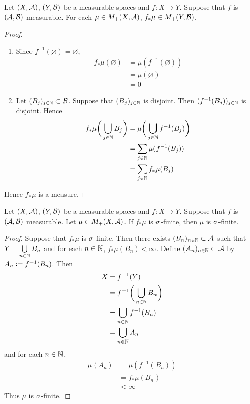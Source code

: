 \documentclass{book}
\begin{document}
\begin{ex} 
	Let $(X, \mathcal{A})$, $(Y, \mathcal{B})$ be a measurable spaces and $f: X \rightarrow Y$. Suppose that $f$ is $(\mathcal{A}, \mathcal{B})$ measurable. For each $\mu \in M_+(X, \mathcal{A})$, $f_*\mu \in M_+(Y, \mathcal{B})$.
\end{ex}

\begin{proof}\
	\begin{enumerate}
		\item Since $f^{-1}(\varnothing) = \varnothing$, 
		\begin{align*}
			f_*\mu(\varnothing) 
			& = \mu(f^{-1}(\varnothing)) \\
			& = \mu(\varnothing) \\
			& = 0
		\end{align*}
		\item Let $(B_j)_{j \in \mathbb{N}} \subset \mathcal{B}$. Suppose that $(B_j)_{j \in \mathbb{N}}$ is disjoint. Then $(f^{-1}(B_j))_{j \in \mathbb{N}}$ is disjoint. Hence 
		\begin{align*}
			f_*\mu \bigg( \bigcup_{j \in \mathbb{N}} B_j \bigg)
			& = \mu \bigg( \bigcup_{j \in \mathbb{N}} f^{-1}(B_j) \bigg) \\
			& = \sum\limits_{j \in \mathbb{N}} \mu(f^{-1}(B_j)) \\
			& = \sum\limits_{j \in \mathbb{N}} f_*\mu(B_j)
		\end{align*}
	\end{enumerate}
	Hence $f_* \mu$ is a measure.
\end{proof}

\begin{ex} 
	Let $(X, \mathcal{A})$, $(Y, \mathcal{B})$ be a measurable spaces and $f: X \rightarrow Y$. Suppose that $f$ is $(\mathcal{A}, \mathcal{B})$ measurable. Let $\mu \in M_+(X, \mathcal{A})$. If $f_*\mu$ is $\sigma$-finite, then $\mu$ is $\sigma$-finite.
\end{ex}

\begin{proof}
	Suppose that $f_*\mu$ is $\sigma$-finite. Then there exists $(B_n)_{n \in \mathbb{N}} \subset \mathcal{A}$ such that $Y = \bigcup\limits_{n \in \mathbb{N}} B_n$ and for each $n \in \mathbb{N}$, $f_*\mu(B_n) < \infty$. Define $(A_n)_{n \in \mathbb{N}} \subset \mathcal{A}$ by $A_n \vcentcolon= f^{-1}(B_n)$. Then 
	\begin{align*}
		X
		& = f^{-1}(Y) \\
		& =  f^{-1} \bigg( \bigcup\limits_{n \in \mathbb{N}} B_n \bigg) \\
		& =  \bigcup\limits_{n \in \mathbb{N}} f^{-1}(B_n) \\
		& =  \bigcup_{n \in \mathbb{N}} A_n \\
	\end{align*}
	and for each $n \in \mathbb{N}$,
	\begin{align*}
		\mu(A_n)
		& = \mu(f^{-1}(B_n)) \\
		& = f_*\mu(B_n) \\
		& < \infty 
	\end{align*}
	Thus $\mu$ is $\sigma$-finite.
\end{proof}
\end{document}
